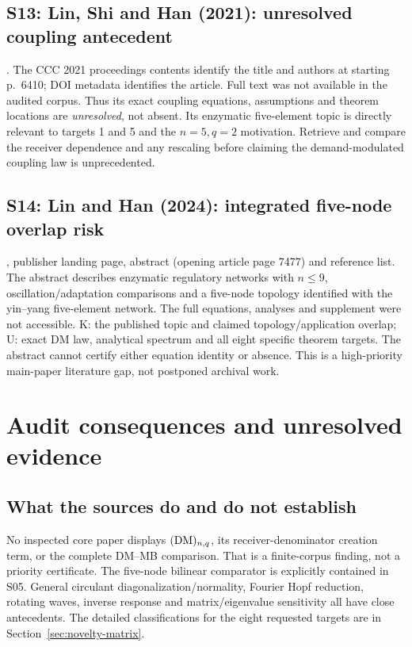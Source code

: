 \subsection{S13: Lin, Shi and Han (2021): unresolved coupling antecedent}
\label{src:lin2021}
\cite{LinShiHan2021}. The CCC 2021 proceedings contents identify
the title and authors at starting p.~6410; DOI metadata identifies
the article. Full text was not available in the audited corpus.
Thus its exact coupling equations, assumptions and theorem
locations are \emph{unresolved}, not absent. Its enzymatic
five-element topic is directly relevant to targets 1 and 5
and the $n=5,q=2$ motivation. Retrieve and compare the
receiver dependence and any rescaling before claiming the
demand-modulated coupling law is unprecedented.

\subsection{S14: Lin and Han (2024): integrated five-node overlap risk}
\label{src:lin2024}
\cite{LinHan2024}, publisher landing page, abstract
(opening article page 7477) and reference list. The abstract
describes enzymatic regulatory networks with $n\leq9$,
oscillation/adaptation comparisons and a five-node topology
identified with the yin--yang five-element network.
The full equations, analyses and supplement were not accessible.
K: the published topic and claimed topology/application
overlap; U: exact DM law, analytical spectrum and all eight
specific theorem targets. The abstract cannot certify either
equation identity or absence. This is a high-priority main-paper
literature gap, not postponed archival work.

\section{Audit consequences and unresolved evidence}
\label{sec:audit-consequences}

\subsection{What the sources do and do not establish}
No inspected core paper displays $(\mathrm{DM})_{n,q}$, its
receiver-denominator creation term, or the complete DM--MB
comparison. That is a finite-corpus finding, not a priority
certificate. The five-node bilinear comparator is explicitly
contained in S05. General circulant diagonalization/normality,
Fourier Hopf reduction, rotating waves, inverse response and
matrix/eigenvalue sensitivity all have close antecedents.
The detailed classifications for the eight requested targets
are in Section~\ref{sec:novelty-matrix}.

